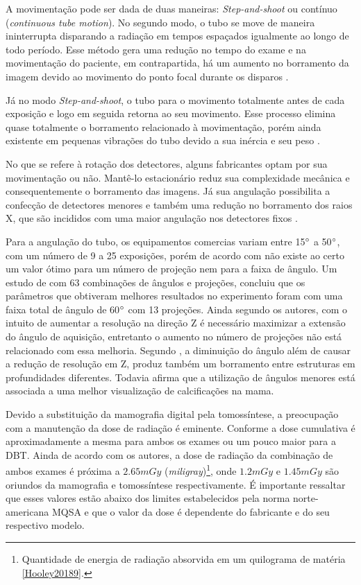 A movimentação pode ser dada de duas maneiras: \textit{Step-and-shoot} ou contínuo (\textit{continuous tube motion}). No segundo modo, o tubo se move de maneira ininterrupta disparando a radiação em tempos espaçados igualmente ao longo de todo período. Esse método gera uma redução no tempo do exame e na movimentação do paciente, em contrapartida, há um aumento no borramento da imagem devido ao movimento do ponto focal durante os disparos \cite{glick2014system}. 

Já no modo \textit{Step-and-shoot}, o tubo para o movimento totalmente antes de cada exposição e logo em seguida retorna ao seu movimento. Esse processo elimina quase totalmente o borramento relacionado à movimentação, porém ainda existente em pequenas vibrações do tubo devido a sua inércia e seu peso \cite{glick2014system}.

No que se refere à rotação dos detectores, alguns fabricantes optam por sua movimentação ou não. Mantê-lo estacionário reduz sua complexidade mecânica e consequentemente o borramento das imagens. Já sua angulação possibilita a confecção de detectores menores e também uma redução no borramento dos raios X, que são incididos com uma maior angulação nos detectores fixos \cite{glick2014system}. 

Para a angulação do tubo, os equipamentos comercias variam entre 15$\degree$ a 50$\degree$, com um número de 9 a 25 exposições, porém de acordo com  não existe ao certo um valor ótimo para um número de projeção nem para a faixa de ângulo. Um estudo de  com 63 combinações de ângulos e projeções, concluiu que os parâmetros que obtiveram melhores resultados no experimento foram com uma faixa total de ângulo de 60$\degree$ com 13 projeções. Ainda segundo os autores, com o intuito de aumentar a resolução na direção Z é necessário maximizar a extensão do ângulo de aquisição, entretanto o aumento no número de projeções não está relacionado com essa melhoria. Segundo , a diminuição do ângulo além de causar a redução de resolução em Z, produz também um borramento entre estruturas em profundidades diferentes. Todavia  afirma que a utilização de ângulos menores está associada a uma melhor visualização de calcificações na mama. 

Devido a substituição da mamografia digital pela tomossíntese, a preocupação com a manutenção da dose de radiação é eminente. Conforme  a dose cumulativa é aproximadamente a mesma para ambos os exames ou um pouco maior para a \acs{DBT}. Ainda de acordo com os autores, a dose de radiação da combinação de ambos exames é próxima a $2.65 mGy$ (\textit{miligray})\footnote{Quantidade de energia de radiação absorvida em um quilograma de matéria \ref{Hooley20189}.}, onde $1.2 mGy$ e $1.45 mGy$ são oriundos da mamografia e tomossíntese respectivamente. É importante ressaltar que esses valores estão abaixo dos limites estabelecidos pela norma norte-americana \ac{MQSA} e que o valor da dose é dependente do fabricante e do seu respectivo modelo. 

